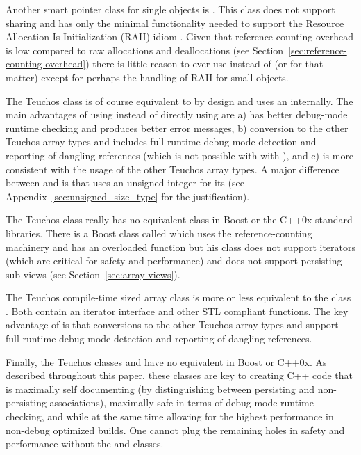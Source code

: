 \documentclass[pdf,ps2pdf,11pt]{SANDreport}
\begin{document}
Another smart pointer class for single objects is
{}.  This class does not support sharing and has
only the minimal functionality needed to support the Resource
Allocation Is Initialization (RAII) idiom {}\cite[Item
13]{C++CodingStandards05}.  Given that reference-counting overhead is
low compared to raw allocations and deallocations (see
Section~\ref{sec:reference-counting-overhead}) there is little reason
to ever use {} instead of {} (or
{} for that matter) except for perhaps the
handling of RAII for small objects.

The Teuchos class {} is of course equivalent to
{} by design and uses an {}
internally.  The main advantages of using {} instead of
directly using {} are a) {} has better
debug-mode runtime checking and produces better error messages, b)
conversion to the other Teuchos array types {} and
{} includes full runtime debug-mode detection and
reporting of dangling references (which is not possible with with
{}), and c) is more consistent with the usage of the
other Teuchos array types.  A major difference between {}
and {} is that {} uses an unsigned integer
for its {} (see Appendix~\ref{sec:unsigned_size_type}
for the justification).

The Teuchos class {} really has no equivalent class in
Boost or the C++0x standard libraries.  There is a Boost class called
{} which uses the {}
reference-counting machinery and has an overloaded
{} function but his class does not support
iterators (which are critical for safety and performance) and does not
support persisting sub-views (see Section~\ref{sec:array-views}).

The Teuchos compile-time sized array class {} is more or
less equivalent to the class {}.  Both contain an
iterator interface and other STL compliant functions.  The key
advantage of {} is that conversions to the other Teuchos
array types {} and {} support full
runtime debug-mode detection and reporting of dangling references.

Finally, the Teuchos classes {} and {} have no
equivalent in Boost or C++0x.  As described throughout this paper,
these classes are key to creating C++ code that is maximally self
documenting (by distinguishing between persisting and non-persisting
associations), maximally safe in terms of debug-mode runtime checking,
and while at the same time allowing for the highest performance in
non-debug optimized builds.  One cannot plug the remaining holes in
safety and performance without the {} and {}
classes.
\end{document}
